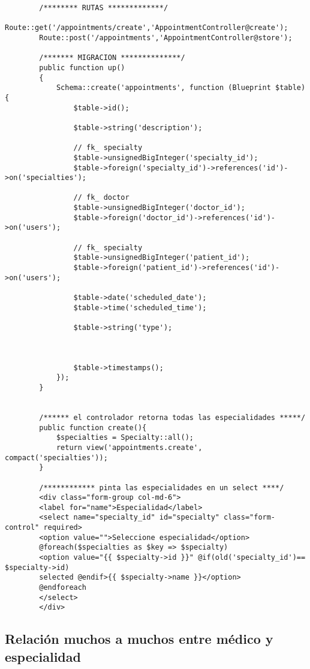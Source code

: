 \documentclass[a4paper]{article}
\begin{document}
	
	\begin{lstlisting}
		/******** RUTAS *************/
		Route::get('/appointments/create','AppointmentController@create');
		Route::post('/appointments','AppointmentController@store');
		
		/******* MIGRACION **************/
		public function up()
		{
			Schema::create('appointments', function (Blueprint $table) {
				$table->id();
				
				$table->string('description');
				
				// fk_ specialty
				$table->unsignedBigInteger('specialty_id');
				$table->foreign('specialty_id')->references('id')->on('specialties');
				
				// fk_ doctor
				$table->unsignedBigInteger('doctor_id');
				$table->foreign('doctor_id')->references('id')->on('users');
				
				// fk_ specialty
				$table->unsignedBigInteger('patient_id');
				$table->foreign('patient_id')->references('id')->on('users');
				
				$table->date('scheduled_date');
				$table->time('scheduled_time');
				
				$table->string('type');
				
				
				
				$table->timestamps();
			});
		}
	
	
		/****** el controlador retorna todas las especialidades *****/
		public function create(){
			$specialties = Specialty::all();
			return view('appointments.create', compact('specialties'));
		}
	
		/************ pinta las especialidades en un select ****/
		<div class="form-group col-md-6">
		<label for="name">Especialidad</label>
		<select name="specialty_id" id="specialty" class="form-control" required>
		<option value="">Seleccione especialidad</option>
		@foreach($specialties as $key => $specialty)
		<option value="{{ $specialty->id }}" @if(old('specialty_id')== $specialty->id)
		selected @endif>{{ $specialty->name }}</option>
		@endforeach
		</select>
		</div>
	\end{lstlisting}

	\subsection{Relación muchos a muchos entre médico y especialidad}
	
\end{document}

